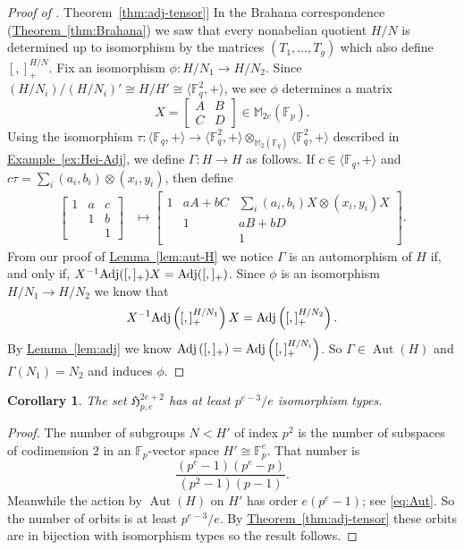 \documentclass[11pt]{article}
\numberwithin{equation}{section}
\theoremstyle{definition}
\theoremstyle{plain}
\newcommand{\expref}[2]{\hyperref[#2]{#1~\ref{#2}}}
\numberwithin{equation}{section}
\theoremstyle{plain}       %
\newtheorem{coro}[equation]{Corollary}
\theoremstyle{remark}
\theoremstyle{definition}
\numberwithin{figure}{section}
\numberwithin{table}{section}
\newcommand{\mygroups}{\mathfrak{H}}
\newcommand{\bbF}{\mathbb{F}}  %
\DeclareMathOperator{\Aut}{Aut}  %
\begin{document}
\begin{proof}[Proof of \expref{Theorem}{thm:adj-tensor}]
In the Brahana correspondence (\expref{Theorem}{thm:Brahana}) we saw that every
nonabelian quotient $H/N$ is determined up to isomorphism  by the matrices
$(T_1,\dots,T_g)$ which also define $[,]_+^{H/N}$.   Fix an isomorphism
$\phi:H/N_1\to H/N_2$.  Since $(H/N_i)/(H/N_i)'\cong
H/H'\cong\langle\bbF_q^2,+\rangle$, we see $\phi$ determines a matrix
\[
  X=\begin{bmatrix} A & B \\ C & D\end{bmatrix} \in \mathbb{M}_{2e}(\bbF_p).
\]
Using the isomorphism $\tau:\langle \bbF_q,+\rangle\to \langle
\bbF_q^2,+\rangle\otimes_{\mathbb{M}_2(\bbF_q)} \langle \bbF_q^2,+\rangle$
described in \expref{Example}{ex:Hei-Adj}, we define $\Gamma:H\to H$ as follows.  If
$c\in \langle\bbF_q,+\rangle$ and $c\tau = \sum_i (a_i,b_i)\otimes (x_i,y_i)$,
then define
\begin{align*}
	\begin{bmatrix}
		1 & a & c \\ & 1 & b \\ & & 1 
	\end{bmatrix}
	& \mapsto
	\begin{bmatrix}
		1 & aA+bC & \sum_i (a_i,b_i)X\otimes (x_i,y_i)X \\ & 1 & aB+bD \\ & & 1 
	\end{bmatrix}.
\end{align*}
{}From our proof of \expref{Lemma}{lem:aut-H} we notice $\Gamma$ is an automorphism of
$H$ if, and only if, $X^{-1}{\rm Adj}([,]_+)X={\rm Adj}([,]_+)$.  Since $\phi$
is an isomorphism $H/N_1\to H/N_2$ we know that
\begin{align*}
	X^{-1}{\rm Adj}\left([,]_+^{H/N_1}\right)X
	={\rm Adj}\left([,]^{H/N_2}_+\right).
\end{align*}
By \expref{Lemma}{lem:adj} we know ${\rm Adj}\left([,]_+\right)={\rm
Adj}\left([,]_+^{H/N_i}\right)$.  So $\Gamma\in \Aut(H)$ and $\Gamma(N_1)=N_2$
and induces $\phi$.
\end{proof}


\begin{coro}\label{coro:count}
The set $\mygroups_{p,e}^{2e+2}$ has at least $p^{e-3}/e$ isomorphism types.
\end{coro}
\begin{proof}
The number of subgroups $N<H'$ of index $p^2$ is the number of subspaces of
codimension 2 in an $\bbF_p$-vector space $H'\cong \bbF_p^e$.  That number is
\[
  \frac{(p^e-1)(p^e-p)}{(p^2-1)(p-1)}.
\]
Meanwhile the action by $\Aut(H)$ on
$H'$ has order $e(p^e-1)$; see \eqref{eq:Aut}.  So the number of orbits is at
least $p^{e-3}/e$.  By \expref{Theorem}{thm:adj-tensor} these orbits are in
bijection with isomorphism types so the result follows.
\end{proof}
\end{document}
